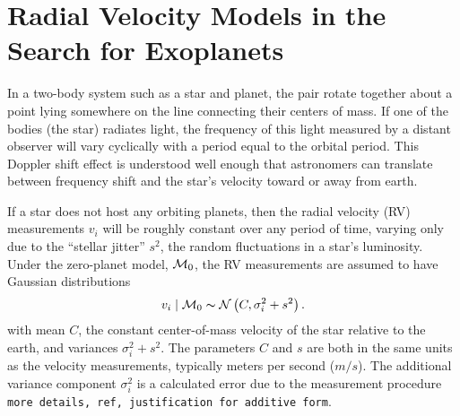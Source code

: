 
\section{Radial Velocity Models in the Search for Exoplanets}
\label{sec:exo}

In a two-body system such as a star and planet, the pair rotate
together about a point lying somewhere on the line connecting their
centers of mass. If one of the bodies (the star) radiates light, the
frequency of this light measured by a distant observer will
 vary  cyclically with a period equal to the orbital period. This
Doppler shift effect is understood well enough that astronomers can
translate between frequency shift and the star's velocity toward or
away from earth.  

If a star does not host any orbiting planets, then the radial velocity
(RV) measurements $v_i$ will be roughly constant over any period of time,
varying only due to the ``stellar jitter'' $s^2$, the random
fluctuations in a star's luminosity. Under the zero-planet
model, ${\cal{M}}_0$, the RV measurements are assumed to  have Gaussian distributions
\begin{equation}\label{0p_Model}
v_i \mid \M_0\ind \mathcal{N}\left(C,\sigma_i^2+s^2\right).
\end{equation}
with mean $C$, the constant center-of-mass velocity of the star
relative to the earth, and variances $\sigma^2_i + s^2$.  The
parameters $C$ and $s$ are both in the same units as the velocity
measurements, typically meters per second ($m/s$).  The additional
variance component $\sigma^2_i$ is a calculated error due to the
measurement procedure {\tt more
  details, ref, justification for additive form}.


